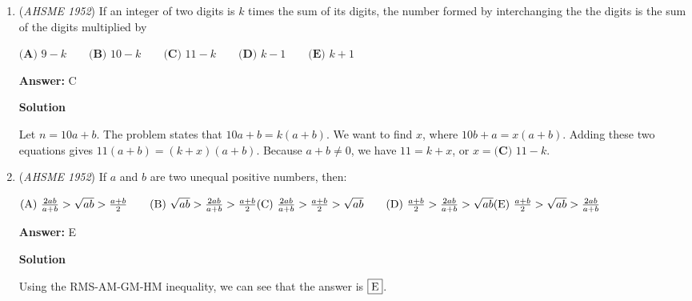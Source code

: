 \begin{enumerate}
 $\textbf{(E) }$ greater than the semi-circumference


 
 \textbf{Answer: }A



\textbf{Solution}

Note that the half the circumference of a circle with diameter $d$ is $\frac{\pi*d}{2}$. 

 Let's call the diameter of the circle D. Dividing the circle's diameter into n parts means that each semicircle has diameter $\frac{D}{n}$, and thus each semicircle measures $\frac{D*pi}{n*2}$. The total sum of those is $n*\frac{D*pi}{n*2}=\frac{D*pi}{2}$, and since that is the exact expression for the semi-circumference of the original circle, the answer is $\boxed{A}$.

 


	\item (\textit{AHSME 1952}) If an integer of two digits is $k$ times the sum of its digits, the number formed by interchanging the the digits is the sum of the digits multiplied by


 $\textbf{(A) \ } 9-k  \qquad \textbf{(B) \ } 10-k \qquad \textbf{(C) \ } 11-k \qquad \textbf{(D) \ } k-1 \qquad \textbf{(E) \ } k+1$

 \textbf{Answer: }C



\textbf{Solution}

Let $n = 10a+b$. The problem states that $10a+b=k(a+b)$. We want to find $x$, where $10b+a=x(a+b)$. Adding these two equations gives $11(a+b) = (k+x)(a+b)$. Because $a+b \neq 0$, we have $11 = k + x$, or $x = \boxed{\textbf{(C) \ } 11-k}$.

 


	\item (\textit{AHSME 1952}) If $a$ and $b$ are two unequal positive numbers, then: 


 $\text{(A) } \frac{2ab}{a+b}>\sqrt{ab}>\frac{a+b}{2}\qquad \text{(B) } \sqrt{ab}>\frac{2ab}{a+b}>\frac{a+b}{2} \\ \text{(C) } \frac{2ab}{a+b}>\frac{a+b}{2}>\sqrt{ab}\qquad \text{(D) } \frac{a+b}{2}>\frac{2ab}{a+b}>\sqrt{ab} \\ \text{(E) } \frac {a + b}{2} > \sqrt {ab} > \frac {2ab}{a + b}$

 \textbf{Answer: }E



\textbf{Solution}

Using the RMS-AM-GM-HM inequality, we can see that the answer is $\fbox{E}$.


\end{enumerate}
